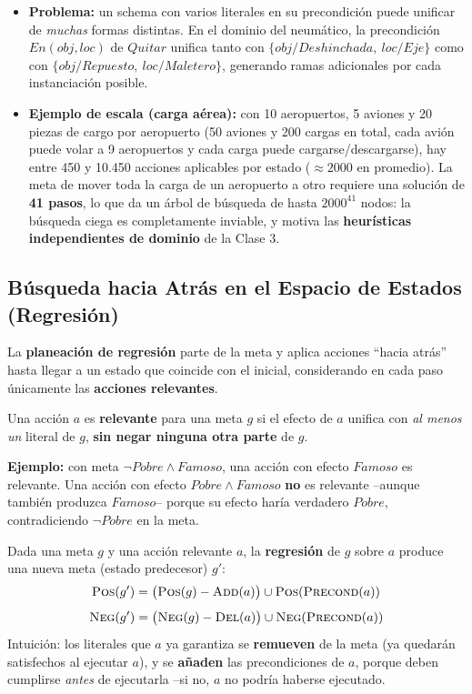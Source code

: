 \begin{itemize}
    \item \textbf{Problema:} un schema con varios literales en su precondición puede unificar de
    \emph{muchas} formas distintas. En el dominio del neumático, la precondición $En(obj,loc)$ de
    $Quitar$ unifica tanto con $\{obj/Deshinchada,\ loc/Eje\}$ como con
    $\{obj/Repuesto,\ loc/Maletero\}$, generando ramas adicionales por cada instanciación posible.
    \item \textbf{Ejemplo de escala (carga aérea):} con 10 aeropuertos, 5 aviones y 20 piezas de
    cargo por aeropuerto (50 aviones y 200 cargas en total, cada avión puede volar a 9 aeropuertos y
    cada carga puede cargarse/descargarse), hay entre 450 y 10.450 acciones aplicables por estado
    ($\approx 2000$ en promedio). La meta de mover toda la carga de un aeropuerto a otro requiere una
    solución de \textbf{41 pasos}, lo que da un árbol de búsqueda de hasta $2000^{41}$ nodos: la
    búsqueda ciega es completamente inviable, y motiva las \textbf{heurísticas independientes de
    dominio} de la Clase 3.
\end{itemize}

\subsection{Búsqueda hacia Atrás en el Espacio de Estados (Regresión)}

La \textbf{planeación de regresión} parte de la meta y aplica acciones ``hacia atrás'' hasta llegar a
un estado que coincide con el inicial, considerando en cada paso únicamente las \textbf{acciones
relevantes}.

\begin{definition}
Una acción $a$ es \textbf{relevante} para una meta $g$ si el efecto de $a$ unifica con \emph{al
menos un} literal de $g$, \textbf{sin negar ninguna otra parte} de $g$.
\end{definition}

\textbf{Ejemplo:} con meta $\neg Pobre \land Famoso$, una acción con efecto $Famoso$ es relevante.
Una acción con efecto $Pobre \land Famoso$ \textbf{no} es relevante --aunque también produzca
$Famoso$-- porque su efecto haría verdadero $Pobre$, contradiciendo $\neg Pobre$ en la meta.

Dada una meta $g$ y una acción relevante $a$, la \textbf{regresión} de $g$ sobre $a$ produce una nueva
meta (estado predecesor) $g'$:
\[
    \textsc{Pos}(g') = \big(\textsc{Pos}(g) - \textsc{Add}(a)\big) \cup \textsc{Pos}(\textsc{Precond}(a))
\]
\[
    \textsc{Neg}(g') = \big(\textsc{Neg}(g) - \textsc{Del}(a)\big) \cup \textsc{Neg}(\textsc{Precond}(a))
\]
Intuición: los literales que $a$ ya garantiza se \textbf{remueven} de la meta (ya quedarán
satisfechos al ejecutar $a$), y se \textbf{añaden} las precondiciones de $a$, porque deben cumplirse
\emph{antes} de ejecutarla --si no, $a$ no podría haberse ejecutado.

